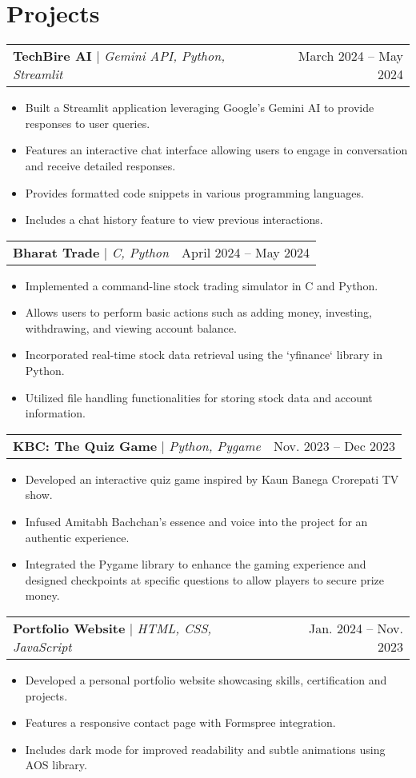 \documentclass[letterpaper,11pt]{article}
\makeatletter
\newcommand{\resumeItem}[1]{
  \item\small{
    {#1 \vspace{-2pt}}
  }
}
\newcommand{\resumeProjectHeading}[2]{
    \item
    \begin{tabular*}{0.97\textwidth}{l@{\extracolsep{\fill}}r}
      \small#1 & #2 \\
    \end{tabular*}\vspace{-7pt}
}
\newcommand{\resumeItemListStart}{\begin{itemize}}
\newcommand{\resumeItemListEnd}{\end{itemize}\vspace{-5pt}}
\makeatother
\begin{document}
\section{Projects}
    \resumeProjectHeading
        {\textbf{TechBire AI} $|$ \emph{Gemini API, Python, Streamlit}}{March 2024 -- May 2024}
        \resumeItemListStart
            \resumeItem{Built a Streamlit application leveraging Google's Gemini AI to provide responses to user queries.}
            \resumeItem{Features an interactive chat interface allowing users to engage in conversation and receive detailed responses.}
            \resumeItem{Provides formatted code snippets in various programming languages.}
            \resumeItem{Includes a chat history feature to view previous interactions.}
        \resumeItemListEnd 

    \resumeProjectHeading
        {\textbf{Bharat Trade} $|$ \emph{C, Python}}{April 2024 -- May 2024}
        \resumeItemListStart
            \resumeItem{Implemented a command-line stock trading simulator in C and Python.}
            \resumeItem{Allows users to perform basic actions such as adding money, investing, withdrawing, and viewing account balance.}
            \resumeItem{Incorporated real-time stock data retrieval using the `yfinance` library in Python.}
            \resumeItem{Utilized file handling functionalities for storing stock data and account information.}
        \resumeItemListEnd

    \resumeProjectHeading
        {\textbf{KBC: The Quiz Game} $|$ \emph{Python, Pygame}}{Nov. 2023 -- Dec 2023}
        \resumeItemListStart
            \resumeItem{Developed an interactive quiz game inspired by Kaun Banega Crorepati TV show.}
            \resumeItem{Infused Amitabh Bachchan's essence and voice into the project for an authentic experience.}
            \resumeItem{Integrated the Pygame library to enhance the gaming experience and designed checkpoints at specific questions to allow players to secure prize money.}
        \resumeItemListEnd

    \resumeProjectHeading
        {\textbf{Portfolio Website} $|$ \emph{HTML, CSS, JavaScript}}{Jan. 2024 -- Nov. 2023}
        \resumeItemListStart
            \resumeItem{Developed a personal portfolio website showcasing skills, certification and projects.}
            \resumeItem{Features a responsive contact page with Formspree integration.}
            \resumeItem{Includes dark mode for improved readability and subtle animations using AOS library.}
        \resumeItemListEnd
\end{document}
